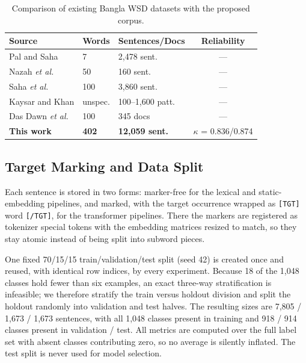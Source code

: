 \documentclass[conference]{IEEEtran}
\begin{document}
\begin{table}[tbp]
\caption{Comparison of existing Bangla WSD datasets with the proposed corpus.}
\label{tab:dataset}
\centering
\setlength{\tabcolsep}{4pt}
\begin{tabular}{@{}lllc@{}}
\toprule
\textbf{Source} & \textbf{Words} & \textbf{Sentences/Docs} & \textbf{Reliability} \\
\midrule
Pal and Saha \cite{palsaha2019} & 7 & 2,478 sent. & --- \\
Nazah \emph{et al.} \cite{nazah2017} & 50 & 160 sent. & --- \\
Saha \emph{et al.} \cite{sahamoumittra2019} & 100 & 3,860 sent. & --- \\
Kaysar and Khan \cite{kaysarkhan2018} & unspec. & 100--1,600 patt. & --- \\
Das Dawn \emph{et al.} \cite{dasdawn2023} & 100 & 345 docs & --- \\
\textbf{This work} & \textbf{402} & \textbf{12,059 sent.} & $\kappa$ = 0.836/0.874 \\
\bottomrule
\end{tabular}
\end{table}



\subsection{Target Marking and Data Split}
Each sentence is stored in two forms: marker-free for the lexical and static-embedding pipelines, and marked, with the target occurrence wrapped as \texttt{[TGT]} word \texttt{[/TGT]}, for the transformer pipelines. There the markers are registered as tokenizer special tokens with the embedding matrices resized to match, so they stay atomic instead of being split into subword pieces.

One fixed 70/15/15 train/validation/test split (seed 42) is created once and reused, with identical row indices, by every experiment. Because 18 of the 1,048 classes hold fewer than six examples, an exact three-way stratification is infeasible; we therefore stratify the train versus holdout division and split the holdout randomly into validation and test halves. The resulting sizes are 7,805 / 1,673 / 1,673 sentences, with all 1,048 classes present in training and 918 / 914 classes present in validation / test. All metrics are computed over the full label set with absent classes contributing zero, so no average is silently inflated. The test split is never used for model selection.
\end{document}
